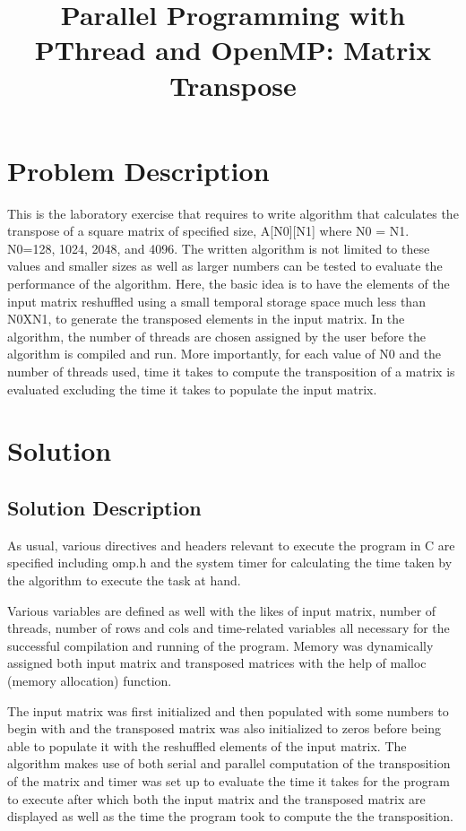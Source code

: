 \documentclass{article}
\begin{document}
\title{Parallel Programming with PThread and OpenMP: Matrix Transpose}

\section{Problem Description}

This is the laboratory exercise that requires to write algorithm that calculates the transpose of a square matrix of specified size, A[N0][N1] where N0 = N1. N0=128, 1024, 2048, and 4096. The written algorithm is not limited to these values and smaller sizes as well as larger numbers can be tested to evaluate the performance of the algorithm. Here, the basic idea is to have the elements of the input matrix reshuffled using a small temporal storage space much less than N0XN1, to generate the transposed elements in the input matrix. In the algorithm, the number of threads are chosen assigned  by the user before the algorithm is compiled and run. More importantly, for each value of N0 and the number of threads used, time it takes to compute the transposition of a matrix is evaluated excluding the time it takes to populate the input matrix. 

\section{Solution}

\subsection{Solution Description}

As usual, various directives and headers relevant to execute the program in C are specified including omp.h and the system timer for calculating the time taken by the algorithm to execute the task at hand.

Various variables are defined as well with the likes of input matrix, number of threads, number of rows and cols and time-related variables all necessary for the successful compilation and running of the program. Memory was dynamically assigned both input matrix and transposed matrices with the help of malloc (memory allocation) function.  

The input matrix was first initialized and then populated with some numbers to begin with and the transposed matrix was also initialized to zeros before being able to populate it with the reshuffled elements of the input matrix. The algorithm makes use of both serial and parallel computation of the transposition of the matrix and timer was set up to evaluate the time it takes for the program to execute after which both the input matrix and the transposed matrix are displayed as well as the time the program took to compute the the transposition. 
\end{document}
